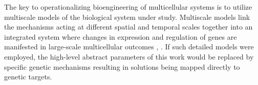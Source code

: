 The key to operationalizing bioengineering of multicellular systems is to utilize multiscale models of the biological system under study. Multiscale models link the mechanisms acting at different spatial and temporal scales together into an integrated system where changes in expression and regulation of genes are manifested in large-scale multicellular outcomes \cite{Martins2010Multiscale}, \cite{JosephWalpole2013Multiscale} \cite{Yu2016Multiclass}. If such detailed models were employed, the high-level abstract parameters of this work would be replaced by specific genetic mechanisms resulting in solutions being mapped directly to genetic targets.


